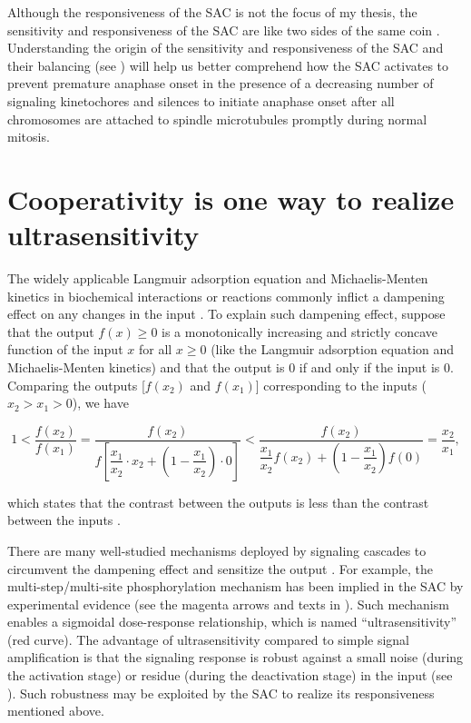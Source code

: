 Although the responsiveness of the SAC is not the focus of my thesis, the sensitivity and responsiveness of the SAC are like two sides of the same coin \cite{eSAC}. Understanding the origin of the sensitivity and responsiveness of the SAC and their balancing (see ) will help us better comprehend how the SAC activates to prevent premature anaphase onset in the presence of a decreasing number of signaling kinetochores and silences to initiate anaphase onset after all chromosomes are attached to spindle microtubules promptly during normal mitosis.

\section{Cooperativity is one way to realize ultrasensitivity}
\label{Cooperativity-Ultrasensitivity}

The widely applicable Langmuir adsorption equation and Michaelis-Menten kinetics in biochemical interactions or reactions commonly inflict a dampening effect on any changes in the input \cite{CooperativityQA}. To explain such dampening effect, suppose that the output $f(x) \geq 0$ is a monotonically increasing and strictly concave function of the input $x$ for all $x \geq 0$ (like the Langmuir adsorption equation and Michaelis-Menten kinetics) and that the output is 0 if and only if the input is 0. Comparing the outputs [$f(x_2)$ and $f(x_1)$] corresponding to the inputs ($x_2 > x_1 > 0$), we have

\begin{equation*}
    1 < \dfrac{f(x_2)}{f(x_1)} = \dfrac{f(x_2)}{f[\dfrac{x_1}{x_2} \cdot x_2 + (1-\dfrac{x_1}{x_2}) \cdot 0]} < \dfrac{f(x_2)}{\dfrac{x_1}{x_2}f(x_2) + (1-\dfrac{x_1}{x_2})f(0)} = \dfrac{x_2}{x_1},
\end{equation*}

\noindent which states that the contrast between the outputs is less than the contrast between the inputs \cite{InhibitorUltrasensitivity}.

There are many well-studied mechanisms deployed by signaling cascades to circumvent the dampening effect and sensitize the output \cite{ZeroOrder, MultistepUltrasensitivity, Bistability}. For example, the multi-step/multi-site phosphorylation mechanism has been implied in the SAC by experimental evidence \cite{Ji2017eLife} (see the magenta arrows and texts in ). Such mechanism enables a sigmoidal dose-response relationship, which is named ``ultrasensitivity'' (red curve). The advantage of ultrasensitivity compared to simple signal amplification is that the signaling response is robust against a small noise (during the activation stage) or residue (during the deactivation stage) in the input (see ). Such robustness may be exploited by the SAC to realize its responsiveness mentioned above.


